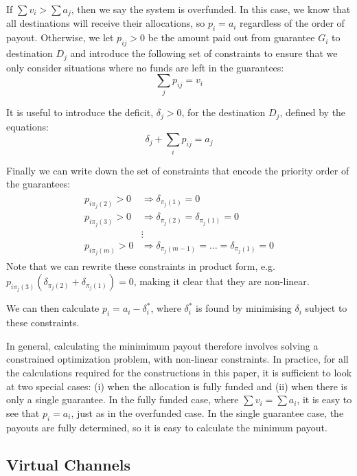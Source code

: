 If $\sum v_i > \sum a_j$, then we say the system is overfunded. 
In this case, we know that all destinations will receive their allocations, so $p_i = a_i$ regardless of the order of payout.
Otherwise, we let $p_{ij} > 0$ be the amount paid out from guarantee $G_i$ to destination $D_j$ and introduce the following set of constraints to ensure that we only consider situations where no funds are left in the guarantees:
\begin{equation}
  \sum_{j} p_{ij} = v_i
\end{equation}

It is useful to introduce the deficit, $\delta_j > 0$, for the destination $D_j$, defined by the equations:
\begin{equation}
  \delta_j + \sum_{i} p_{ij} = a_j
\end{equation}

Finally we can write down the set of constraints that encode the priority order of the guarantees:
\begin{align}
\begin{split}
  p_{i\pi_j(2)} > 0 &\Rightarrow \delta_{\pi_j(1)} = 0 \\
  p_{i\pi_j(3)} > 0 &\Rightarrow \delta_{\pi_j(2)} = \delta_{\pi_j(1)}  = 0 \\
  &\vdots \\
  p_{i\pi_j(m)} > 0 &\Rightarrow \delta_{\pi_j(m-1)} = \dots = \delta_{\pi_j(1)}  = 0 
\end{split}
\end{align}
Note that we can rewrite these constraints in product form, e.g. $p_{i\pi_j(3)}(\delta_{\pi_j(2)} + \delta_{\pi_j(1)}) = 0$, making it clear that they are non-linear.

We can then calculate $p_i = a_i - \delta_i^*$, where $\delta^*_i$ is found by minimising $\delta_i$ subject to these constraints.

In general, calculating the minimimum payout therefore involves solving a constrained optimization problem, with non-linear constraints.
In practice, for all the calculations required for the constructions in this paper, it is sufficient to look at two special cases: (i) when the allocation is fully funded and (ii) when there is only a single guarantee.
In the fully funded case, where $\sum v_i = \sum a_i$, it is easy to see that $p_i = a_i$, just as in the overfunded case.
In the single guarantee case, the payouts are fully determined, so it is easy to calculate the minimum payout.

\subsection{Virtual Channels}


